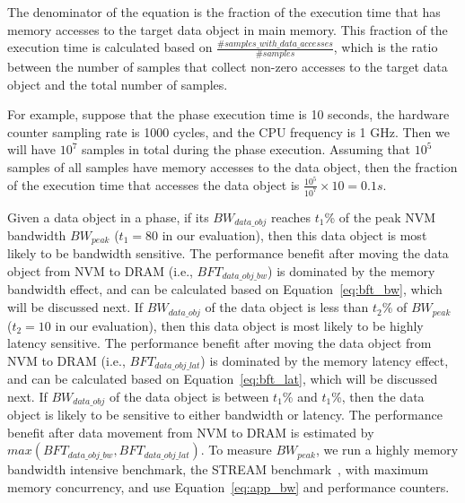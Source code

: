 The denominator of the equation is the fraction of the execution time that has memory accesses to the target data object in main memory.
This fraction of the execution time is calculated based on $\frac{\#samples\_with\_data\_accesses}{\#samples}$, which is the ratio between the number of samples that collect non-zero accesses to the target data object and the total number of samples.

For example, suppose that the phase execution time is 10 seconds, the hardware counter sampling rate is 1000 cycles, and the CPU frequency is 1 GHz. Then we will have $10^7$ samples in total during the phase execution. Assuming that $10^5$ samples of all samples have memory accesses to the data object, then the fraction of the execution time that accesses the data object is $\frac{10^5}{10^7} \times 10 = 0.1s$. 

Given a data object in a phase, if its  $BW_{data\_obj}$ reaches $t_1$\% of  the peak NVM bandwidth $BW_{peak}$ ($t_1=80$ in our evaluation), then this data object is most likely to be bandwidth sensitive. The performance benefit after moving the data object from NVM to DRAM (i.e., $BFT_{data\_obj\_bw}$) is dominated by the memory bandwidth effect, and can be
calculated based on Equation~\ref{eq:bft_bw}, which will be discussed next.
If $BW_{data\_obj}$ of the data object is less than $t_2$\% of $BW_{peak}$ ($t_2=10$ in our evaluation), then this data object is most likely to be highly latency sensitive.
The performance benefit after moving the data object from NVM to DRAM (i.e., $BFT_{data\_obj\_lat}$) is dominated by the memory latency effect, and can be
calculated based on Equation~\ref{eq:bft_lat}, which will be discussed next.
If $BW_{data\_obj}$ of the data object 
is between $t_1$\% and $t_1$\%, then the data object is likely
to be sensitive to either bandwidth or latency. %
The performance benefit after data movement from NVM to DRAM
is estimated by $max(BFT_{data\_obj\_bw}, BFT_{data\_obj\_lat})$.
To measure $BW_{peak}$, we run 
a highly memory bandwidth intensive benchmark, the STREAM benchmark~\cite{stream_benchmark}, with maximum memory concurrency, and use Equation~\ref{eq:app_bw} and performance counters.


